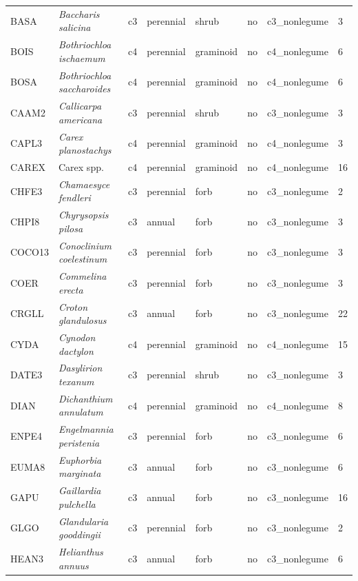 \begin{landscape}
\begin{table}[]
{\begin{tabular}{p{2cm}p{5cm}p{2cm}p{2cm}p{2cm}p{2cm}p{3.5cm}p{2cm}}
            BASA   & \textit{Baccharis salicina}        & c3 & perennial & shrub          & no  & c3\_nonlegume & 3  \\
            BOIS   & \textit{Bothriochloa ischaemum}    & c4 & perennial & graminoid      & no  & c4\_nonlegume & 6  \\
            BOSA   & \textit{Bothriochloa saccharoides} & c4 & perennial & graminoid      & no  & c4\_nonlegume & 6  \\
            CAAM2  & \textit{Callicarpa americana}      & c3 & perennial & shrub          & no  & c3\_nonlegume & 3  \\
            CAPL3  & \textit{Carex planostachys}        & c4 & perennial & graminoid      & no  & c4\_nonlegume & 3  \\
            CAREX  & Carex spp.                         & c4 & perennial & graminoid      & no  & c4\_nonlegume & 16 \\
            CHFE3  & \textit{Chamaesyce fendleri}       & c3 & perennial & forb           & no  & c3\_nonlegume & 2  \\
            CHPI8  & \textit{Chyrysopsis pilosa}        & c3 & annual    & forb           & no  & c3\_nonlegume & 3  \\
            COCO13 & \textit{Conoclinium coelestinum}   & c3 & perennial & forb           & no  & c3\_nonlegume & 3  \\
            COER   & \textit{Commelina erecta}          & c3 & perennial & forb           & no  & c3\_nonlegume & 3  \\
            CRGLL  & \textit{Croton glandulosus}        & c3 & annual    & forb           & no  & c3\_nonlegume & 22 \\
            CYDA   & \textit{Cynodon dactylon}          & c4 & perennial & graminoid      & no  & c4\_nonlegume & 15 \\
            DATE3  & \textit{Dasylirion texanum}        & c3 & perennial & shrub          & no  & c3\_nonlegume & 3  \\
            DIAN   & \textit{Dichanthium annulatum}     & c4 & perennial & graminoid      & no  & c4\_nonlegume & 8  \\
            ENPE4  & \textit{Engelmannia peristenia}    & c3 & perennial & forb           & no  & c3\_nonlegume & 6  \\
            EUMA8  & \textit{Euphorbia marginata}       & c3 & annual    & forb           & no  & c3\_nonlegume & 6  \\
            GAPU   & \textit{Gaillardia pulchella}      & c3 & annual    & forb           & no  & c3\_nonlegume & 16 \\
            GLGO   & \textit{Glandularia gooddingii}    & c3 & perennial & forb           & no  & c3\_nonlegume & 2  \\
            HEAN3  & \textit{Helianthus annuus}         & c3 & annual    & forb           & no  & c3\_nonlegume & 6  \\
        \end{tabular}}
    \end{table}
\end{landscape}
\clearpage

